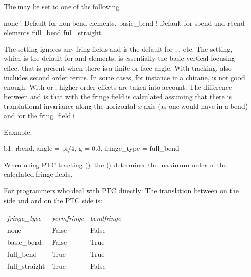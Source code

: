 The  may be set to one of the following
\begin{example}
  none              ! Default for non-bend elements.
  basic_bend        ! Default for sbend and rbend elements
  full_bend
  full_straight
\end{example}
The  setting ignores any fring fields and is the default for
, , etc. The  setting,
which is the default for  and  elements, is
essentially the basic vertical focusing effect that is present when
there is a finite  or  face angle. With
 tracking,  also includes second
order terms.  In some cases, for instance in a chicane,
 is not good enough. With  or
, higher order effects are taken into account.  The
difference between  and  is that with
 the fringe field is calculated assuming that there is
translational invariance along the horizontal $x$ axis (as one would have 
in a bend) and for  the fring_field i

Eaxmple:
\begin{example}
  b1: rbend, angle = pi/4, g = 0.3, fringe_type = full_bend
\end{example}

When using PTC tracking (), the
 () determines the maximum
order of the calculated fringe fields.

For programmers who deal with PTC directly: The translation between
 on the \bmad side and  and  
on the PTC side is:
\begin{center}
\begin{tabular}{|l|l|l} \hline
{\em fringe_type} & {\em permfringe} & {\em bendfringe} \\
  none            & False            & False            \\    
  basic_bend      & False            & True             \\    
  full_bend       & True             & True             \\    
  full_straight   & True             & False            \\    
\end{tabular}
\end{center}

